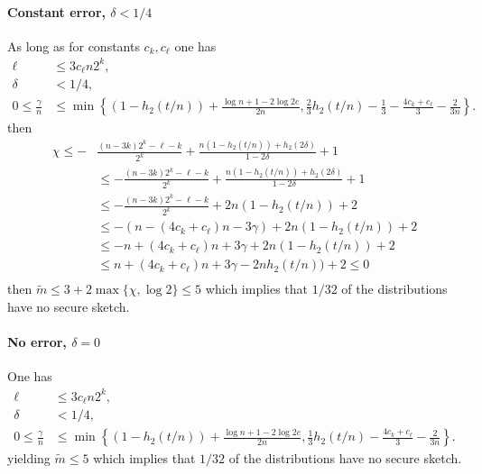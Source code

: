 \paragraph{Constant error, $\delta<1/4$} 
As long as for constants $c_k, c_\ell$ one has
\begin{align*}
\ell&\le 3c_\ell n2^k,\\
\delta &< 1/4,\\
0\le\frac{\gamma}{n} &\le \min\left\{(1-h_2(t/n)) +\frac{\log{n}+1-2\log{2e}}{2n}, \frac{2}{3}h_2(t/n)-\frac{1}{3}-\frac{4c_k+c_\ell}{3}-\frac{2}{3n}\right\}.
\end{align*} then 
\begin{align*}
\chi\le-&\frac{(n-3k)2^k-\ell-k}{2^k} + \frac{n(1-h_2(t/n)) +h_2(2\delta)}{1-2\delta}+1\\
&\le -\frac{(n-3k)2^k-\ell-k}{2^k} + \frac{n(1-h_2(t/n)) +h_2(2\delta)}{1-2\delta}+1 \\
&\le -\frac{(n-3k)2^k-\ell-k}{2^k} + 2n(1-h_2(t/n)) +2\\
 &\le -(n-(4c_k+c_\ell)n - 3\gamma) + 2n(1-h_2(t/n)) +2\\
&\le -n+(4c_k+c_\ell)n+3\gamma + 2n(1-h_2(t/n))+2 \\\
&\le n+(4c_k+c_\ell)n+3\gamma -2nh_2(t/n))+2 \le 0\\
\end{align*}
then $\tilde{m} \le 3+2\max\{\chi, \log{2}\} \le 5$ which implies that $1/32$ of the distributions have no secure sketch.

\paragraph{No error, $\delta=0$}
One has
\begin{align*}
\ell&\le 3c_\ell n2^k,\\
\delta &< 1/4,\\
0\le\frac{\gamma}{n} &\le \min\left\{(1-h_2(t/n)) +\frac{\log{n}+1-2\log{2e}}{2n}, \frac{1}{3}h_2(t/n)-\frac{4c_k+c_\ell}{3}-\frac{2}{3n}\right\}.
\end{align*} 
yielding $\tilde{m}\le 5$ which implies that $1/32$ of the distributions have no secure sketch.




